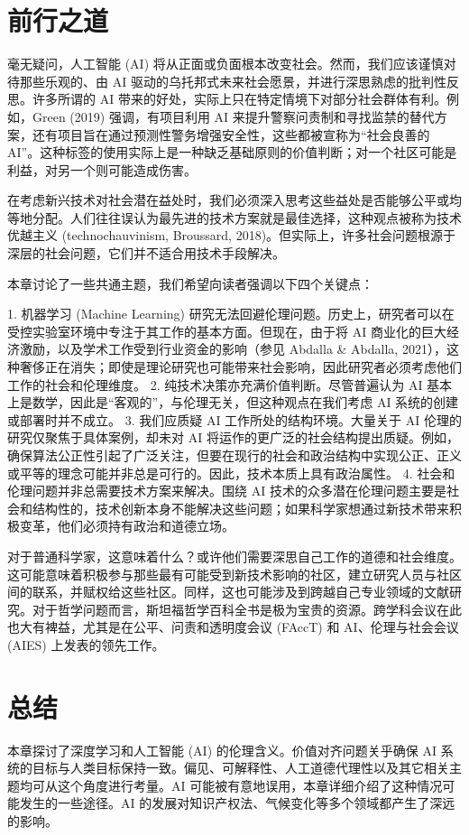 \documentclass[lang=cn,newtx,10pt,scheme=chinese]{elegantbook}
\begin{document}
\section{前行之道}
毫无疑问，人工智能 (AI) 将从正面或负面根本改变社会。然而，我们应该谨慎对待那些乐观的、由 AI 驱动的乌托邦式未来社会愿景，并进行深思熟虑的批判性反思。许多所谓的 AI 带来的好处，实际上只在特定情境下对部分社会群体有利。例如，Green (2019) 强调，有项目利用 AI 来提升警察问责制和寻找监禁的替代方案，还有项目旨在通过预测性警务增强安全性，这些都被宣称为“社会良善的 AI”。这种标签的使用实际上是一种缺乏基础原则的价值判断；对一个社区可能是利益，对另一个则可能造成伤害。

在考虑新兴技术对社会潜在益处时，我们必须深入思考这些益处是否能够公平或均等地分配。人们往往误认为最先进的技术方案就是最佳选择，这种观点被称为技术优越主义 (technochauvinism, Broussard, 2018)。但实际上，许多社会问题根源于深层的社会问题，它们并不适合用技术手段解决。

本章讨论了一些共通主题，我们希望向读者强调以下四个关键点：

1. 机器学习 (Machine Learning) 研究无法回避伦理问题。历史上，研究者可以在受控实验室环境中专注于其工作的基本方面。但现在，由于将 AI 商业化的巨大经济激励，以及学术工作受到行业资金的影响（参见 Abdalla \& Abdalla, 2021），这种奢侈正在消失；即使是理论研究也可能带来社会影响，因此研究者必须考虑他们工作的社会和伦理维度。
2. 纯技术决策亦充满价值判断。尽管普遍认为 AI 基本上是数学，因此是“客观的”，与伦理无关，但这种观点在我们考虑 AI 系统的创建或部署时并不成立。
3. 我们应质疑 AI 工作所处的结构环境。大量关于 AI 伦理的研究仅聚焦于具体案例，却未对 AI 将运作的更广泛的社会结构提出质疑。例如，确保算法公正性引起了广泛关注，但要在现行的社会和政治结构中实现公正、正义或平等的理念可能并非总是可行的。因此，技术本质上具有政治属性。
4. 社会和伦理问题并非总需要技术方案来解决。围绕 AI 技术的众多潜在伦理问题主要是社会和结构性的，技术创新本身不能解决这些问题；如果科学家想通过新技术带来积极变革，他们必须持有政治和道德立场。

对于普通科学家，这意味着什么？或许他们需要深思自己工作的道德和社会维度。这可能意味着积极参与那些最有可能受到新技术影响的社区，建立研究人员与社区间的联系，并赋权给这些社区。同样，这也可能涉及到跨越自己专业领域的文献研究。对于哲学问题而言，斯坦福哲学百科全书是极为宝贵的资源。跨学科会议在此也大有裨益，尤其是在公平、问责和透明度会议 (FAccT) 和 AI、伦理与社会会议 (AIES) 上发表的领先工作。

\section{总结}
本章探讨了深度学习和人工智能 (AI) 的伦理含义。价值对齐问题关乎确保 AI 系统的目标与人类目标保持一致。偏见、可解释性、人工道德代理性以及其它相关主题均可从这个角度进行考量。AI 可能被有意地误用，本章详细介绍了这种情况可能发生的一些途径。AI 的发展对知识产权法、气候变化等多个领域都产生了深远的影响。
\end{document}
